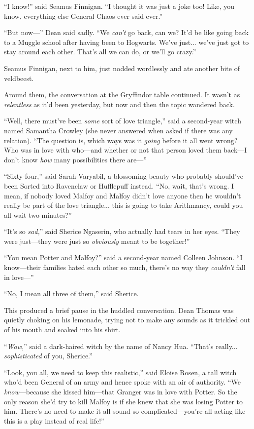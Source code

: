 “I know!” said Seamus Finnigan. “I thought it was just a joke too! Like, you know, everything else General Chaos ever said ever.”

“But now—” Dean said sadly. “We \emph{can’t} go back, can we? It’d be like going back to a Muggle school after having been to Hogwarts. We’ve just... we’ve just got to stay around each other. That’s all we can do, or we’ll go crazy.”

Seamus Finnigan, next to him, just nodded wordlessly and ate another bite of veldbeest.

Around them, the conversation at the Gryffindor table continued. It wasn’t as \emph{relentless} as it’d been yesterday, but now and then the topic wandered back.

“Well, there must’ve been \emph{some} sort of love triangle,” said a second-year witch named Samantha Crowley (she never answered when asked if there was any relation). “The question is, which ways was it \emph{going} before it all went wrong? Who was in love with who—and whether or not that person loved them back—I don’t know \emph{how} many possibilities there are—”

“Sixty-four,” said Sarah Varyabil, a blossoming beauty who probably should’ve been Sorted into Ravenclaw or Hufflepuff instead. “No, wait, that’s wrong. I mean, if nobody loved Malfoy and Malfoy didn’t love anyone then he wouldn’t really be part of the love triangle... this is going to take Arithmancy, could you all wait two minutes?”

“It’s so \emph{sad,}” said Sherice Ngaserin, who actually had tears in her eyes. “They were just—they were just so \emph{obviously} meant to be together!”

“You mean Potter and Malfoy?” said a second-year named Colleen Johnson. “I know—their families hated each other so much, there’s no way they \emph{couldn’t} fall in love—”

“No, I mean all three of them,” said Sherice.

This produced a brief pause in the huddled conversation. Dean Thomas was quietly choking on his lemonade, trying not to make any sounds as it trickled out of his mouth and soaked into his shirt.

“\emph{Wow,}” said a dark-haired witch by the name of Nancy Hua. “That’s really... \emph{sophisticated} of you, Sherice.”

“Look, you all, we need to keep this realistic,” said Eloise Rosen, a tall witch who’d been General of an army and hence spoke with an air of authority. “We \emph{know}—because she kissed him—that Granger was in love with Potter. So the only reason she’d try to kill Malfoy is if she knew that she was losing Potter to him. There’s no need to make it all sound so complicated—you’re all acting like this is a play instead of real life!”

